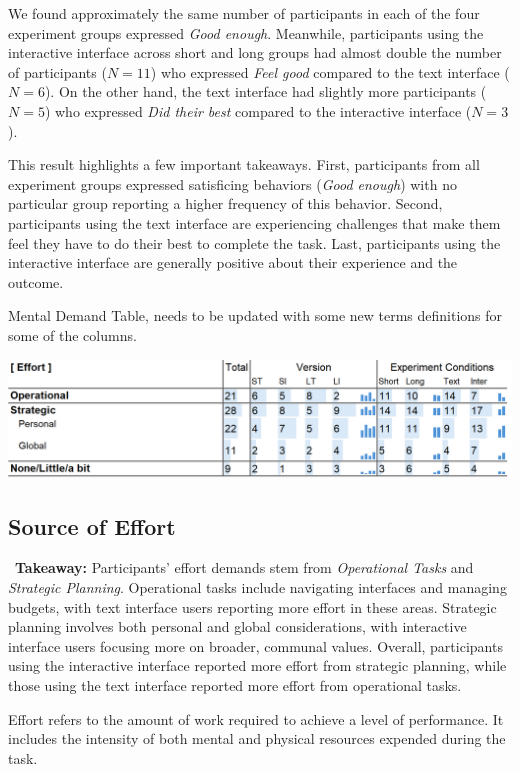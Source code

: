 We found approximately the same number of participants in each of the four experiment groups expressed \textit{Good enough}. Meanwhile, participants using the interactive interface across short and long groups had almost double the number of participants ($N=11$) who expressed \textit{Feel good} compared to the text interface ($N=6$). On the other hand, the text interface had slightly more participants ($N=5$) who expressed \textit{Did their best} compared to the interactive interface ($N=3$).

This result highlights a few important takeaways. First, participants from all experiment groups expressed satisficing behaviors (\textit{Good enough}) with no particular group reporting a higher frequency of this behavior. Second, participants using the text interface are experiencing challenges that make them feel they have to do their best to complete the task. Last, participants using the interactive interface are generally positive about their experience and the outcome.



\begin{table}[h]
    \caption{Mental Demand Table, needs to be updated with some new terms definitions for some of the columns.}
    \label{tbl:physical}
    \includegraphics[width=\linewidth]{content/image/cog/effort_table.png}
\end{table}

\subsection{Source of Effort}
\label{sec:effort}

\vspace{5pt}
\begin{tldrbox}
    \faInfoCircle~\xspace\textbf{Takeaway:} Participants' effort demands stem from \textit{Operational Tasks} and \textit{Strategic Planning}. Operational tasks include navigating interfaces and managing budgets, with text interface users reporting more effort in these areas. Strategic planning involves both personal and global considerations, with interactive interface users focusing more on broader, communal values. Overall, participants using the interactive interface reported more effort from strategic planning, while those using the text interface reported more effort from operational tasks.
\end{tldrbox}
Effort refers to the amount of work required to achieve a level of performance. It includes the intensity of both mental and physical resources expended during the task.

